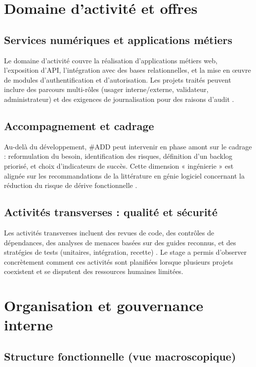 \section{Domaine d'activité et offres}

\subsection{Services numériques et applications métiers}

Le domaine d'activité couvre la réalisation d'applications métiers web, l'exposition d'API, l'intégration avec des bases relationnelles, et la mise en œuvre de modules d'authentification et d'autorisation. Les projets traités peuvent inclure des parcours multi-rôles (usager interne/externe, validateur, administrateur) et des exigences de journalisation pour des raisons d'audit \cite{iso25010,owasp2021}.

\subsection{Accompagnement et cadrage}

Au-delà du développement, \#ADD peut intervenir en phase amont sur le cadrage : reformulation du besoin, identification des risques, définition d'un backlog priorisé, et choix d'indicateurs de succès. Cette dimension « ingénierie » est alignée sur les recommandations de la littérature en génie logiciel concernant la réduction du risque de dérive fonctionnelle \cite{sommerville2016}.

\subsection{Activités transverses : qualité et sécurité}

Les activités transverses incluent des revues de code, des contrôles de dépendances, des analyses de menaces basées sur des guides reconnus, et des stratégies de tests (unitaires, intégration, recette) \cite{ieee1012,owasp2021}. Le stage a permis d'observer concrètement comment ces activités sont planifiées lorsque plusieurs projets coexistent et se disputent des ressources humaines limitées.

\section{Organisation et gouvernance interne}

\subsection{Structure fonctionnelle (vue macroscopique)}

